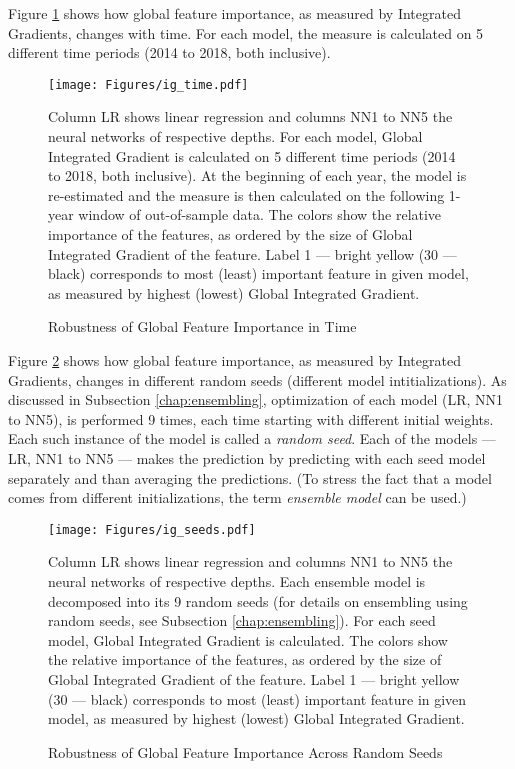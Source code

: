 		Figure \ref{fig:ig_time} shows how global feature importance, as measured by Integrated Gradients, changes with time. For each model, the measure is calculated on 5 different time periods (2014 to 2018, both inclusive).
		
		\begin{center}
			\begin{figure}
				\texttt{[image: Figures/ig\_time.pdf]}
				\caption{Robustness of Global Feature Importance in Time}
				\medskip
				\small
				Column LR shows linear regression and columns NN1 to NN5 the neural networks of respective depths. For each model, Global Integrated Gradient is calculated on 5 different time periods (2014 to 2018, both inclusive). At the beginning of each year, the model is re-estimated and the measure is then calculated on the following 1-year window of out-of-sample data. The colors show the relative importance of the features, as ordered by the size of Global Integrated Gradient of the feature. Label 1 --- bright yellow (30 --- black) corresponds to most (least) important feature in given model, as measured by highest (lowest) Global Integrated Gradient.   
				\label{fig:ig_time}
			\end{figure}
		\end{center}
	
	
		Figure \ref{fig:ig_seeds} shows how global feature importance, as measured by Integrated Gradients, changes in different random seeds (different model intitializations). As discussed in Subsection \ref{chap:ensembling}, optimization of each model (LR, NN1 to NN5), is performed 9 times, each time starting with different initial weights. Each such instance of the model is called a \textit{random seed}. Each of the models --- LR, NN1 to NN5 --- makes the prediction by predicting with each seed model separately and than averaging the predictions. (To stress the fact that a model comes from different initializations, the term \textit{ensemble model} can be used.)
		
		\begin{center}
			\begin{figure}
				\texttt{[image: Figures/ig\_seeds.pdf]}
				\caption{Robustness of Global Feature Importance Across Random Seeds}
				\medskip
				\small
				Column LR shows linear regression and columns NN1 to NN5 the neural networks of respective depths. Each ensemble model is decomposed into its 9 random seeds (for details on ensembling using random seeds, see Subsection \ref{chap:ensembling}). For each seed model, Global Integrated Gradient is calculated. The colors show the relative importance of the features, as ordered by the size of Global Integrated Gradient of the feature. Label 1 --- bright yellow (30 --- black) corresponds to most (least) important feature in given model, as measured by highest (lowest) Global Integrated Gradient.    
				\label{fig:ig_seeds}
			\end{figure}
		\end{center}
		

